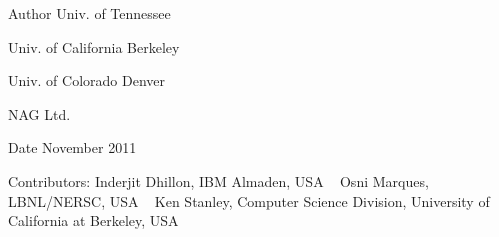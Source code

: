 \begin{DoxyAuthor}{Author}
Univ. of Tennessee 

Univ. of California Berkeley 

Univ. of Colorado Denver 

N\+A\+G Ltd. 
\end{DoxyAuthor}
\begin{DoxyDate}{Date}
November 2011 
\end{DoxyDate}
\begin{DoxyParagraph}{Contributors\+: }
Inderjit Dhillon, I\+B\+M Almaden, U\+S\+A ~\newline
 Osni Marques, L\+B\+N\+L/\+N\+E\+R\+S\+C, U\+S\+A ~\newline
 Ken Stanley, Computer Science Division, University of California at Berkeley, U\+S\+A ~\newline

\end{DoxyParagraph}
